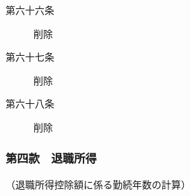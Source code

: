 \documentclass[twocolumn,a4j,10pt]{ltjtarticle}
\begin{document}
\begin{description}
\item[第六十六条]削除
\end{description}
\begin{description}
\item[第六十七条]削除
\end{description}
\begin{description}
\item[第六十八条]削除
\end{description}
\subsubsection*{第四款　退職所得}
\noindent\hspace{10pt}（退職所得控除額に係る勤続年数の計算）
\end{document}
